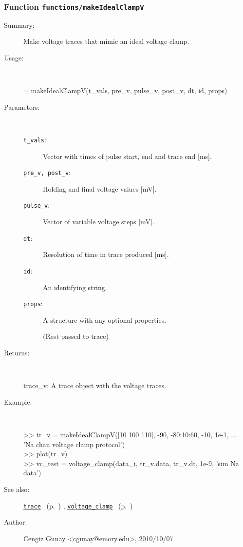 \subsubsection[Function \texttt{makeIdealClampV}]{Function \texttt{functions/makeIdealClampV}}%
%
\label{ref_functions__makeIdealClampV}%
\hypertarget{ref_functions__makeIdealClampV}{}%
\begin{description}
\item[Summary:]Make voltage traces that mimic an ideal voltage clamp.
%
\item[Usage:]~%
\begin{lyxcode}%
[trace\_v] = makeIdealClampV(t\_vals, pre\_v, pulse\_v, post\_v, dt, id, props)
%
\end{lyxcode}%
%
%
\item[Parameters:]~
\begin{description}%
\item[\texttt{t\_vals}:]
 Vector with times of pulse start, end and trace end [ms].
\item[\texttt{pre\_v, post\_v}:]
 Holding and final voltage values [mV].
\item[\texttt{pulse\_v}:]
 Vector of variable voltage steps [mV].
\item[\texttt{dt}:]
 Resolution of time in trace produced [ms].
\item[\texttt{id}:]
 An identifying string.
\item[\texttt{props}:]
 A structure with any optional properties.

(Rest passed to trace)
\end{description}%
%
\item[Returns:
]~

   trace\_v: A trace object with the voltage traces.
%
\item[Example:]~
\begin{lyxcode} >> tr\_v = makeIdealClampV([10 100 110], -90, -80:10:60, -10, 1e-1, ...
\\%
                           'Na chan voltage clamp protocol')
\\%
 >> plot(tr\_v)
\\%
 >> vc\_test = voltage\_clamp(data\_i, tr\_v.data, tr\_v.dt, 1e-9, 'sim Na data')
\\%
\end{lyxcode}
%
\item[See also:]%
\hyperlink{ref_trace}{\texttt{trace}}%
\ (p.~\pageref{ref_trace})%
%
, \hyperlink{ref_voltage_clamp}{\texttt{voltage\_clamp}}%
\ (p.~\pageref{ref_voltage_clamp})%
%
%
\item[Author:]%
Cengiz Gunay <cgunay@emory.edu>, 2010/10/07
%
\end{description}
\methodline%
